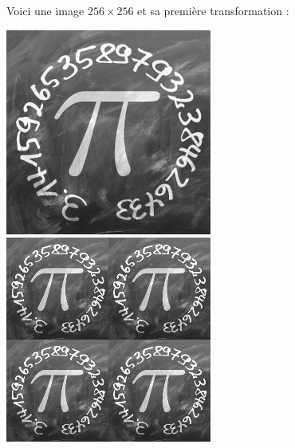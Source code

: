 \documentclass[11pt,class=report,crop=false]{standalone}
\begin{document}
\begin{cours}
Voici une image $256 \times 256$ et sa première transformation :

\begin{center}
\includegraphics[scale=\myscale,scale=0.4]{images_fiche/pi_gimp_new_photo_0.png}\qquad\qquad
\includegraphics[scale=\myscale,scale=0.4]{images_fiche/pi_gimp_new_photo_1.png}
\end{center}


\end{cours}
\end{document}

